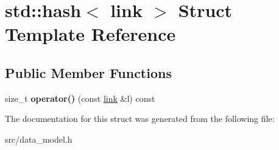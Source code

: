 \hypertarget{structstd_1_1hash_3_01link_01_4}{}\section{std\+:\+:hash$<$ link $>$ Struct Template Reference}
\label{structstd_1_1hash_3_01link_01_4}
\subsection*{Public Member Functions}
\begin{DoxyCompactItemize}
\item 
\mbox{\label{structstd_1_1hash_3_01link_01_4_a8fa2e70ae6c22fd0234a24ede888b3c1}} 
size\+\_\+t {\bfseries operator()} (const \hyperlink{structlink}{link} \&l) const
\end{DoxyCompactItemize}


The documentation for this struct was generated from the following file\+:\begin{DoxyCompactItemize}
\item 
src/data\+\_\+model.\+h\end{DoxyCompactItemize}
